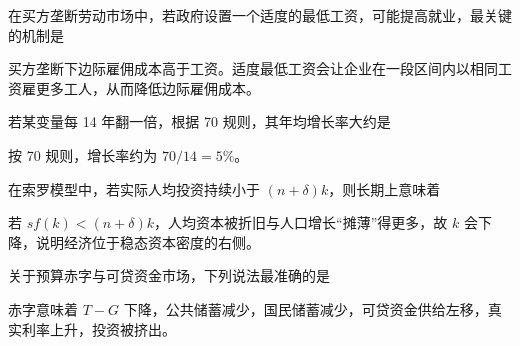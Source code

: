 \begin{question}
在买方垄断劳动市场中，若政府设置一个适度的最低工资，可能提高就业，最关键的机制是
\begin{choiceoptions}[2]
\end{choiceoptions}
\begin{solution}
买方垄断下边际雇佣成本高于工资。适度最低工资会让企业在一段区间内以相同工资雇更多工人，从而降低边际雇佣成本。
\end{solution}
\end{question}

\begin{question}
若某变量每 14 年翻一倍，根据 70 规则，其年均增长率大约是
\begin{choiceoptions}[2]
\end{choiceoptions}
\begin{solution}
按 70 规则，增长率约为 $70/14=5\%$。
\end{solution}
\end{question}

\begin{question}
在索罗模型中，若实际人均投资持续小于 $(n+\delta)k$，则长期上意味着
\begin{choiceoptions}[2]
\end{choiceoptions}
\begin{solution}
若 $sf(k)<(n+\delta)k$，人均资本被折旧与人口增长“摊薄”得更多，故 $k$ 会下降，说明经济位于稳态资本密度的右侧。
\end{solution}
\end{question}

\begin{question}
关于预算赤字与可贷资金市场，下列说法最准确的是
\begin{choiceoptions}[1]
\end{choiceoptions}
\begin{solution}
赤字意味着 $T-G$ 下降，公共储蓄减少，国民储蓄减少，可贷资金供给左移，真实利率上升，投资被挤出。
\end{solution}
\end{question}

